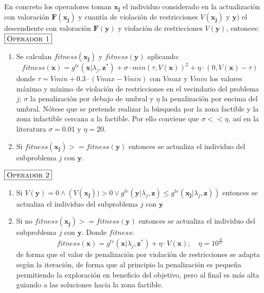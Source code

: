 \begin{enumerate}
     En concreto los operadores toman $\boldsymbol{x_j}$ el individuo considerado en la actualización con valoración $\boldsymbol{F}(\boldsymbol{x_j})$ y cuantía de violación de restricciones $V(\boldsymbol{x_j})$ y $\boldsymbol{y})$ el descendiente con valoración $\boldsymbol{F}(\boldsymbol{y})$ y violación de restricciones $V(\boldsymbol{y})$, entonces:\\
    
    \noindent$\boxed{\textsc{Operador 1}}$\\
    \begin{enumerate}
    \item Se calculan $fitness(\boldsymbol{x_j})$ y   $fitness(\boldsymbol{y})$ aplicando:  $$ fitness(\boldsymbol{x}) = g^{te}(\boldsymbol{x} \vert \lambda_j, \boldsymbol{z}^{*}) + \sigma \cdot min(\tau, V(\boldsymbol{x}))^{2} + \eta \cdot (0, V(\boldsymbol{x}) - \tau)$$ donde $\tau = Vmin + 0.3 \cdot (Vmax - Vmin)$ con $Vmax$ y $Vmin$ los valores máximo y mínimo de violación de restricciones en el vecindario del problema $j$; $\sigma$ la penalización por debajo de umbral y $\eta$ la penalización por encima del umbral. Nótese que se pretende realizar la búsqueda por la zona factible y la zona infactible cercana a la factible. Por ello conviene que $\sigma << \eta$, así en la literatura $\sigma=0.01$ y $\eta=20$.\\
          
    \item Si $fitness(\boldsymbol{x_j}) >= fitness(\boldsymbol{y})$ entonces se actualiza el individuo del subproblema $j$ con $\boldsymbol{y}$. \\
    \end{enumerate}
    
    \noindent $\boxed{\textsc{Operador 2}}$\\
    \begin{enumerate}
    \item Si $V(\boldsymbol{y})=0 \wedge \left(V(\boldsymbol{x_j}))>0 \vee g^{te}(\boldsymbol{y}| \lambda_j, \boldsymbol{z}) \leq  g^{te}(\boldsymbol{x_j}| \lambda_j, \boldsymbol{z})\right)$  entonces se actualiza el individuo del subproblema $j$ con $\boldsymbol{y}$ \\
          
    \item Si no $fitness(\boldsymbol{x_j}) >= fitness(\boldsymbol{y})$ entonces se actualiza el individuo del subproblema $j$ con $\boldsymbol{y}$. Donde $fitness$: $$ fitness(\boldsymbol{x}) = g^{te}(\boldsymbol{x} \vert \lambda_j, \boldsymbol{z}^{*}) + \eta \cdot V(\boldsymbol{x}); \quad \eta = 10^{\frac{it}{G}} $$ de forma que el valor de penalización por violación de restricciones se adapta según la iteración, de forma que al principio la penalización es pequeña permitiendo la exploración en beneficio del objetivo, pero al final es más alta guiando a las soluciones hacia la zona factible.\\
    \end{enumerate}
    


\end{enumerate}
